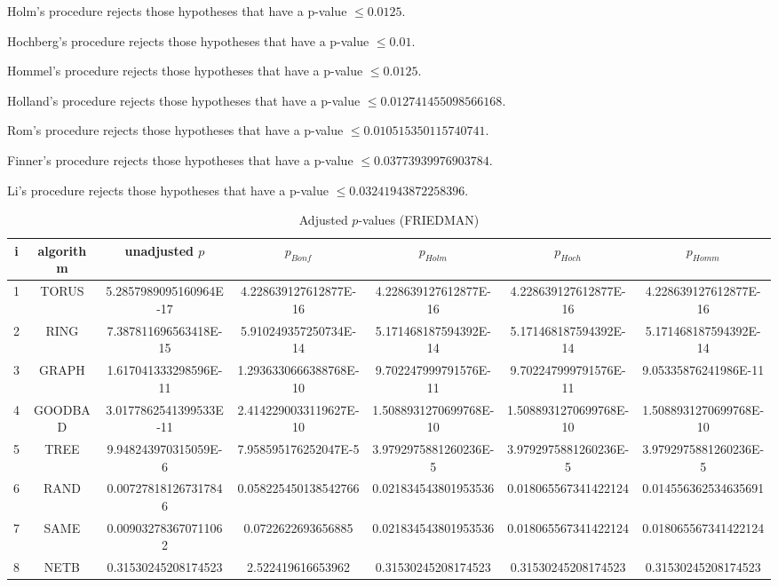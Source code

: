 \documentclass[a4paper,10pt]{article}
\begin{document}
\begin{landscape}
Holm's procedure rejects those hypotheses that have a p-value $\le0.0125$.


Hochberg's procedure rejects those hypotheses that have a p-value $\le0.01$.


Hommel's procedure rejects those hypotheses that have a p-value $\le0.0125$.


Holland's procedure rejects those hypotheses that have a p-value $\le0.012741455098566168$.


Rom's procedure rejects those hypotheses that have a p-value $\le0.010515350115740741$.


Finner's procedure rejects those hypotheses that have a p-value $\le0.03773939976903784$.


Li's procedure rejects those hypotheses that have a p-value $\le0.03241943872258396$.



\newpage

\begin{table}[!htp]
\centering\scriptsize
\caption{Adjusted $p$-values (FRIEDMAN)}
\begin{tabular}{ccccccc}
i&algorithm&unadjusted $p$&$p_{Bonf}$&$p_{Holm}$&$p_{Hoch}$&$p_{Homm}$\\
\hline
1& TORUS&5.2857989095160964E-17&4.228639127612877E-16&4.228639127612877E-16&4.228639127612877E-16&4.228639127612877E-16\\
2& RING&7.387811696563418E-15&5.910249357250734E-14&5.171468187594392E-14&5.171468187594392E-14&5.171468187594392E-14\\
3& GRAPH&1.617041333298596E-11&1.2936330666388768E-10&9.702247999791576E-11&9.702247999791576E-11&9.05335876241986E-11\\
4& GOODBAD&3.0177862541399533E-11&2.4142290033119627E-10&1.5088931270699768E-10&1.5088931270699768E-10&1.5088931270699768E-10\\
5& TREE&9.948243970315059E-6&7.958595176252047E-5&3.9792975881260236E-5&3.9792975881260236E-5&3.9792975881260236E-5\\
6& RAND&0.007278181267317846&0.058225450138542766&0.021834543801953536&0.018065567341422124&0.014556362534635691\\
7& SAME&0.009032783670711062&0.0722622693656885&0.021834543801953536&0.018065567341422124&0.018065567341422124\\
8& NETB&0.31530245208174523&2.522419616653962&0.31530245208174523&0.31530245208174523&0.31530245208174523\\
\hline
\end{tabular}
\end{table}


\end{landscape}
\end{document}

